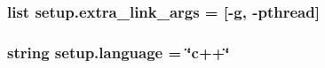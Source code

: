 \subsubsection[{extra\+\_\+link\+\_\+args}]{\setlength{\rightskip}{0pt plus 5cm}list setup.\+extra\+\_\+link\+\_\+args = \mbox{[}\textquotesingle{}-\/g\textquotesingle{}, \textquotesingle{}-\/pthread\textquotesingle{}\mbox{]}}\label{namespacesetup_a3ecdc68a8b675e6105cdb4896e3a3f13}
\hypertarget{namespacesetup_a7c551b774528bc8ca826e41c09a9c266}{}
\subsubsection[{language}]{\setlength{\rightskip}{0pt plus 5cm}string setup.\+language = \char`\"{}c++\char`\"{}}\label{namespacesetup_a7c551b774528bc8ca826e41c09a9c266}
